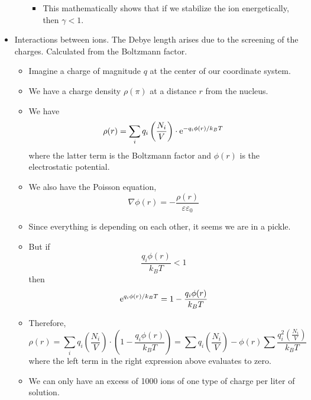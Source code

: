 \documentclass[../notes.tex]{subfiles}
\begin{document}
\begin{itemize}
\begin{itemize}
        \begin{itemize}
            \item This mathematically shows that if we stabilize the ion energetically, then $\gamma<1$.
        \end{itemize}
    \end{itemize}
    \item Interactions between ions. The Debye length arises due to the screening of the charges. Calculated from the Boltzmann factor.
    \begin{itemize}
        \item Imagine a charge of magnitude $q$ at the center of our coordinate system.
        \item We have a charge density $\rho(\pi)$ at a distance $r$ from the nucleus.
        \item We have
        \begin{equation*}
            \rho(r) = \sum_iq_i\left( \frac{N_i}{V} \right)\cdot\e[-q_i\phi(r)/k_BT]
        \end{equation*}
        where the latter term is the Boltzmann factor and $\phi(r)$ is the electrostatic potential.
        \item We also have the Poisson equation,
        \begin{equation*}
            \nabla\phi(r) = -\frac{\rho(r)}{\varepsilon\varepsilon_0}
        \end{equation*}
        \item Since everything is depending on each other, it seems we are in a pickle.
        \item But if
        \begin{equation*}
            \frac{q_i\phi(r)}{k_BT} < 1
        \end{equation*}
        then
        \begin{equation*}
            \e[q_i\phi(r)/k_BT] = 1-\frac{q_i\phi(r)}{k_BT}
        \end{equation*}
        \item Therefore,
        \begin{equation*}
            \rho(r) = \sum_iq_i\left( \frac{N_i}{V} \right)\cdot\left( 1-\frac{q_i\phi(r)}{k_BT} \right)
            = \sum q_i\left( \frac{N_i}{V} \right)-\phi(r)\sum\frac{q_i^2\left( \frac{N_i}{V} \right)}{k_BT}
        \end{equation*}
        where the left term in the right expression above evaluates to zero.
        \item We can only have an excess of 1000 ions of one type of charge per liter of solution.

\end{itemize}
\end{itemize}
\end{document}
